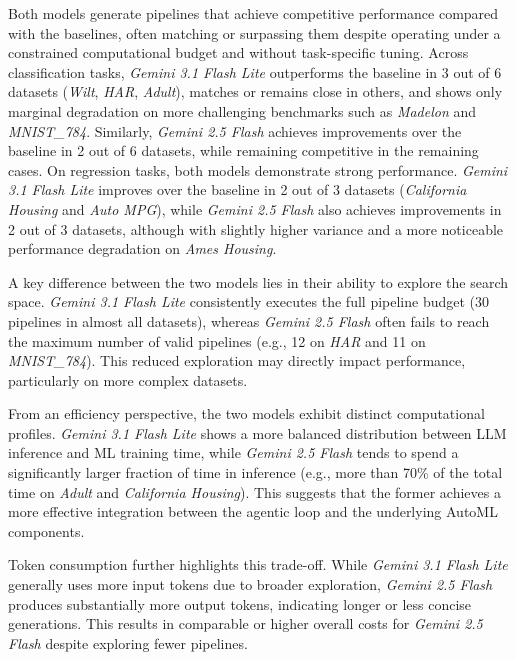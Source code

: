 \documentclass[runningheads]{llncs}
\begin{document}
Both models generate pipelines that achieve competitive performance compared with the baselines,
often matching or surpassing them despite operating under a constrained computational budget and without task-specific tuning.
%
Across classification tasks,
\textit{Gemini 3.1 Flash Lite} outperforms the baseline in 3 out of 6 datasets (\textit{Wilt}, \textit{HAR}, \textit{Adult}),
matches or remains close in others,
and shows only marginal degradation on more challenging benchmarks such as \textit{Madelon} and \textit{MNIST\_784}.
%
Similarly,
\textit{Gemini 2.5 Flash} achieves improvements over the baseline in 2 out of 6 datasets,
while remaining competitive in the remaining cases.
%
On regression tasks, both models demonstrate strong performance.
\textit{Gemini 3.1 Flash Lite} improves over the baseline in 2 out of 3 datasets (\textit{California Housing} and \textit{Auto MPG}),
while \textit{Gemini 2.5 Flash} also achieves improvements in 2 out of 3 datasets,
although with slightly higher variance and a more noticeable performance degradation on \textit{Ames Housing}.

A key difference between the two models lies in their ability to explore the search space.
%
\textit{Gemini 3.1 Flash Lite} consistently executes the full pipeline budget
(30 pipelines in almost all datasets),
whereas \textit{Gemini 2.5 Flash} often fails to reach the maximum number of valid pipelines
(e.g., 12 on \textit{HAR} and 11 on \textit{MNIST\_784}).
%
This reduced exploration may directly impact performance,
particularly on more complex datasets.

From an efficiency perspective,
the two models exhibit distinct computational profiles.
%
\textit{Gemini 3.1 Flash Lite} shows a more balanced distribution between \ac{LLM} inference and ML training time,
while \textit{Gemini 2.5 Flash} tends to spend a significantly larger fraction of time in inference
(e.g., more than 70\% of the total time on \textit{Adult} and \textit{California Housing}).
%
This suggests that the former achieves a more effective integration between the agentic loop and the underlying \ac{AutoML} components.
%

Token consumption further highlights this trade-off.
%
While \textit{Gemini 3.1 Flash Lite} generally uses more input tokens due to broader exploration,
\textit{Gemini 2.5 Flash} produces substantially more output tokens, indicating longer or less concise generations.
%
This results in comparable or higher overall costs for \textit{Gemini 2.5 Flash} despite exploring fewer pipelines.
\end{document}
